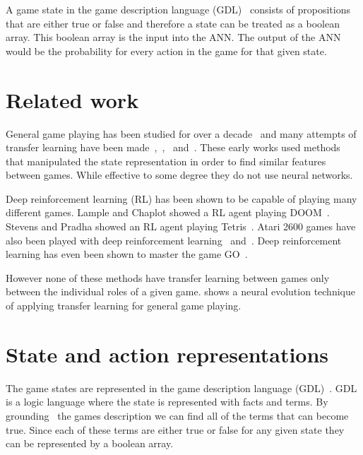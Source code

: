 \documentclass[twocolumn, letterpaper, 10 pt, conference]{ieeeconf}  %
\begin{document}
    
    A game state in the game description language (GDL)~\cite{Love2006} consists of propositions that are either true or false and therefore a state can be treated as a boolean array. This boolean array is the input into the ANN. The output of the ANN would be the probability for every action in the game for that given state.
    
    
    
\section{Related work}
    
    General game playing has been studied for over a decade~\cite{Genesereth2005} and many attempts of transfer learning have been made~\cite{banerjee2007general},~\cite{kuhlmann2007graph},~\cite{sato2015transfer} and~\cite{banerjee2006value}. These early works used methods that manipulated the state representation in order to find similar features between games. While effective to some degree they do not use neural networks.
    
    Deep reinforcement learning (RL) has been shown to be capable of playing many different games. Lample and Chaplot showed a RL agent playing DOOM~\cite{lample2016playing}. Stevens and Pradha showed an RL agent playing Tetris~\cite{stevensplaying}. Atari 2600 games have also been played with deep reinforcement learning~\cite{mnih2013playing} and~\cite{mnih2015human}. Deep reinforcement learning has even been shown to master the game GO~\cite{silver2016mastering}.

    However none of these methods have transfer learning between games only between the individual roles of a given game. \cite{hardwick2017evolving} shows a neural evolution technique of applying transfer learning for general game playing.
          
\section{State and action representations}
    The game states are represented in the game description language (GDL)~\cite{Love2006}. GDL is a logic language where the state is represented with facts and terms. By grounding~\cite{schiffel2016grounding} the games description we can find all of the terms that can become true. Since each of these terms are either true or false for any given state they can be represented by a boolean array. 
    
\end{document}

